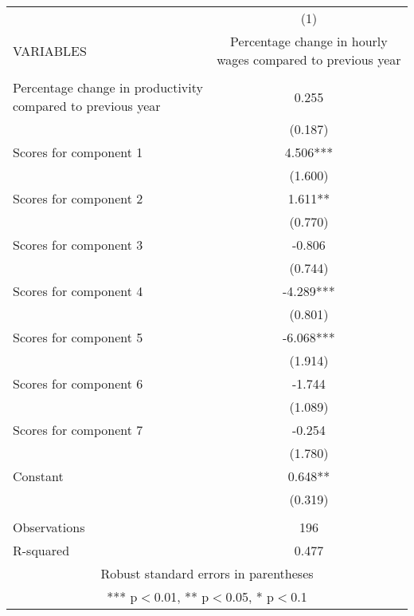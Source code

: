 \documentclass[]{article}
\begin{document}
\begin{tabular}{lc} \hline
 & (1) \\
VARIABLES & Percentage change in hourly wages compared to previous year \\ \hline
 &  \\
Percentage change in productivity compared to previous year & 0.255 \\
 & (0.187) \\
Scores for component 1 & 4.506*** \\
 & (1.600) \\
Scores for component 2 & 1.611** \\
 & (0.770) \\
Scores for component 3 & -0.806 \\
 & (0.744) \\
Scores for component 4 & -4.289*** \\
 & (0.801) \\
Scores for component 5 & -6.068*** \\
 & (1.914) \\
Scores for component 6 & -1.744 \\
 & (1.089) \\
Scores for component 7 & -0.254 \\
 & (1.780) \\
Constant & 0.648** \\
 & (0.319) \\
 &  \\
Observations & 196 \\
 R-squared & 0.477 \\ \hline
\multicolumn{2}{c}{ Robust standard errors in parentheses} \\
\multicolumn{2}{c}{ *** p$<$0.01, ** p$<$0.05, * p$<$0.1} \\
\end{tabular}
\end{document}
